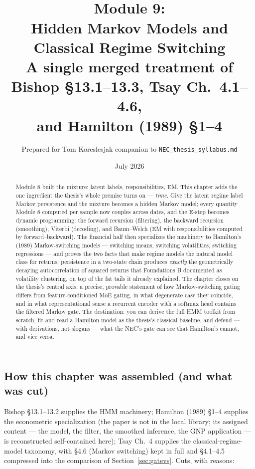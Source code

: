 \documentclass[11pt]{article}
\title{\vspace{-1.2em}{\large\sffamily Foundations for a Quant Research Pipeline}\\[0.4em]
\textbf{Module 9:\\ Hidden Markov Models and Classical Regime Switching}\\[0.3em]
{\large A single merged treatment of Bishop \S13.1--13.3, Tsay Ch.\ 4.1--4.6,\\ and Hamilton (1989) \S1--4}}
\author{Prepared for Tom Koreslesjak \;\textperiodcentered\; companion to \texttt{NEC\_thesis\_syllabus.md}}
\date{July 2026}
\numberwithin{equation}{section}
\theoremstyle{plain}
\theoremstyle{definition}
\theoremstyle{remark}
\begin{document}
\maketitle
\vspace{-1.5em}

\begin{abstract}
\noindent Module 8 built the mixture: latent labels, responsibilities, EM. This chapter adds the one ingredient the thesis's whole premise turns on --- \emph{time}. Give the latent regime label Markov persistence and the mixture becomes a hidden Markov model; every quantity Module 8 computed per sample now couples across dates, and the E-step becomes dynamic programming: the forward recursion (filtering), the backward recursion (smoothing), Viterbi (decoding), and Baum--Welch (EM with responsibilities computed by forward--backward). The financial half then specializes the machinery to Hamilton's (1989) Markov-switching models --- switching means, switching volatilities, switching regressions --- and proves the two facts that make regime models the natural model class for returns: persistence in a two-state chain produces \emph{exactly} the geometrically decaying autocorrelation of squared returns that Foundations B documented as volatility clustering, on top of the fat tails it already explained. The chapter closes on the thesis's central axis: a precise, provable statement of how Markov-switching gating differs from feature-conditioned MoE gating, in what degenerate case they coincide, and in what representational sense a recurrent encoder with a softmax head contains the filtered Markov gate. The destination: you can derive the full HMM toolkit from scratch, fit and read a Hamilton model as the thesis's classical baseline, and defend --- with derivations, not slogans --- what the NEC's gate can see that Hamilton's cannot, and vice versa.
\end{abstract}

\tableofcontents

\subsection*{How this chapter was assembled (and what was cut)}

Bishop \S13.1--13.2 supplies the HMM machinery; Hamilton (1989) \S1--4 supplies the econometric specialization (the paper is not in the local library; its assigned content --- the model, the filter, the smoothed inference, the GNP application --- is reconstructed self-contained here); Tsay Ch.\ 4 supplies the classical-regime-model taxonomy, with \S4.6 (Markov switching) kept in full and \S4.1--4.5 compressed into the comparison of Section~\ref{sec:gatevs}. Cuts, with reasons:
\end{document}
